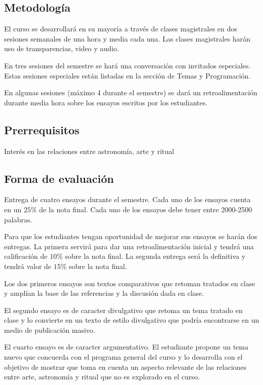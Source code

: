 \documentclass{report}
\begin{document}
\subsection*{Metodolog\'ia}

El curso se desarrollar\'a en su mayor\'ia a trav\'es de clases
magistrales en dos sesiones semanales de una hora y media cada
una. Las clases magistrales har\'an uso de transparencias, video y
audio. 

En tres sesiones del semestre se har\'a una conversaci\'on con
invitados especiales. Estas sesiones especiales est\'an listadas en
la secci\'on de Temas y Programaci\'on.  

En algunas sesiones (m\'aximo 4 durante el semestre) se dar\'a un
retroalimentaci\'on durante media hora sobre los ensayos escritos por los
estudiantes. 

\subsection*{Prerrequisitos}
Inter\'es en las relaciones entre astronom\'ia, arte y ritual

\subsection*{Forma de evaluaci\'on}

Entrega de cuatro ensayos durante el semestre. Cada uno de los ensayos
cuenta en un $25 \%$ de la nota final. Cada uno de los ensayos debe
tener entre 2000-2500 palabras.  

Para que los estudiantes tengan oportunidad de mejorar sus ensayos se
har\'an dos entregas. La primera servir\'a para dar una
retroalimentaci\'on inicial y tendr\'a una calificaci\'on de $10\%$
sobre la nota final. La segunda entrega ser\'a la definitiva y
tendr\'a  valor de $15\%$ sobre la nota final. 
 
Los dos primeros ensayos son textos comparativos que retoman  tratados
en clase y ampl\'ian la base de las referencias y la discusi\'on dada
en clase. 

El segundo ensayo es de caracter divulgativo que retoma un tema
tratado en clase y lo convierte en un texto de estilo divulgativo que
podr\'ia encontrarse en un medio de publicaci\'on masivo. 

El cuarto ensayo es de caracter argumentativo. El estudiante propone
un tema nuevo que concuerda con el programa general del curso y lo
desarrolla con el objetivo de mostrar que toma en cuenta un aspecto
relevante de las relaciones entre arte, astronom\'ia y ritual que
no es explorado en el curso.
\end{document}
